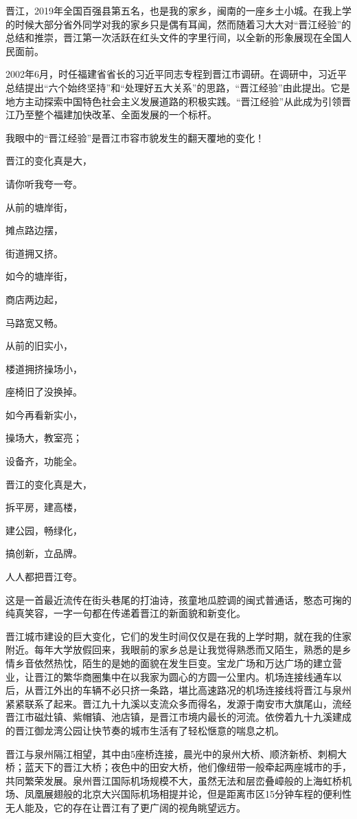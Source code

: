 \documentclass[]{book}
\begin{document}
晋江，2019年全国百强县第五名，也是我的家乡，闽南的一座乡土小城。在我上学的时候大部分省外同学对我的家乡只是偶有耳闻，然而随着习大大对``晋江经验''的总结和推崇，晋江第一次活跃在红头文件的字里行间，以全新的形象展现在全国人民面前。

2002年6月，时任福建省省长的习近平同志专程到晋江市调研。在调研中，习近平总结提出``六个始终坚持''和``处理好五大关系''的思路，``晋江经验''由此提出。它是地方主动探索中国特色社会主义发展道路的积极实践。``晋江经验''从此成为引领晋江乃至整个福建加快改革、全面发展的一个标杆。

我眼中的``晋江经验''是晋江市容市貌发生的翻天覆地的变化！

晋江的变化真是大，

请你听我夸一夸。

从前的塘岸街，

摊点路边摆，

街道拥又挤。

如今的塘岸街，

商店两边起，

马路宽又畅。

从前的旧实小，

楼道拥挤操场小，

座椅旧了没换掉。

如今再看新实小，

操场大，教室亮；

设备齐，功能全。

晋江的变化真是大，

拆平房，建高楼，

建公园，畅绿化，

搞创新，立品牌。

人人都把晋江夸。

这是一首最近流传在街头巷尾的打油诗，孩童地瓜腔调的闽式普通话，憨态可掬的纯真笑容，一字一句都在传递着晋江的新面貌和新变化。

晋江城市建设的巨大变化，它们的发生时间仅仅是在我的上学时期，就在我的住家附近。每年大学放假回来，我眼前的家乡总是让我觉得熟悉而又陌生，熟悉的是乡情乡音依然热忱，陌生的是她的面貌在发生巨变。宝龙广场和万达广场的建立营业，让晋江的繁华商圈集中在以我家为圆心的方圆一公里内。机场连接线通车以后，从晋江外出的车辆不必只挤一条路，堪比高速路况的机场连接线将晋江与泉州紧紧联系了起来。晋江九十九溪以支流众多而得名，发源于南安市大旗尾山，流经晋江市磁灶镇、紫帽镇、池店镇，是晋江市境内最长的河流。依傍着九十九溪建成的晋江御龙湾公园让快节奏的城市生活有了轻松惬意的喘息之机。

晋江与泉州隔江相望，其中由5座桥连接，晨光中的泉州大桥、顺济新桥、刺桐大桥；蓝天下的晋江大桥；夜色中的田安大桥，他们像纽带一般牵起两座城市的手，共同繁荣发展。泉州晋江国际机场规模不大，虽然无法和层峦叠嶂般的上海虹桥机场、凤凰展翅般的北京大兴国际机场相提并论，但是距离市区15分钟车程的便利性无人能及，它的存在让晋江有了更广阔的视角眺望远方。
\end{document}
